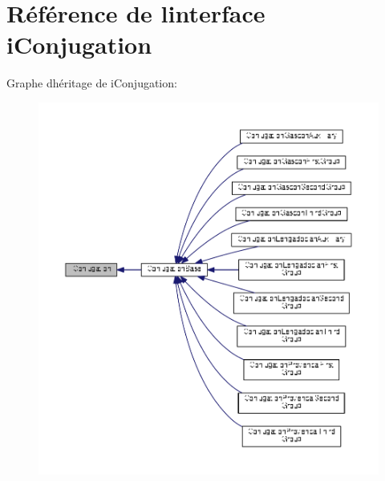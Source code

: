 \hypertarget{interfacei_conjugation}{}\section{Référence de l\textquotesingle{}interface i\+Conjugation}
\label{interfacei_conjugation}


Graphe d\textquotesingle{}héritage de i\+Conjugation\+:
\nopagebreak
\begin{figure}[H]
\begin{center}
\leavevmode
\includegraphics[width=350pt]{interfacei_conjugation__inherit__graph}
\end{center}
\end{figure}
